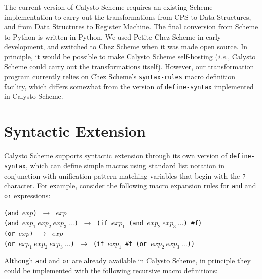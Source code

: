 \documentclass[acmsmall,screen,authorversion]{acmart}
\begin{document}
The current version of Calysto Scheme requires an existing Scheme
implementation to carry out the transformations from CPS to Data Structures,
and from Data Structures to Register Machine.  The final conversion from Scheme
to Python is written in Python.  We used Petite Chez Scheme in early
development, and switched to Chez Scheme when it was made open source. In
principle, it would be possible to make Calysto Scheme self-hosting
(\emph{i.e.}, Calysto Scheme could carry out the transformations
itself). However, our transformation program currently relies on Chez Scheme's
\texttt{syntax-rules} macro definition facility, which differs somewhat from
the version of \texttt{define-syntax} implemented in Calysto Scheme.


\section{Syntactic Extension}

\noindent
Calysto Scheme supports syntactic extension through its own version of
\texttt{define-syntax}, which can define simple macros using standard list
notation in conjunction with unification pattern matching variables that
begin with the \texttt{?} character.  For example, consider the following
macro expansion rules for \texttt{and} and \texttt{or} expressions:\\

\begin{minipage}{\textwidth}
\texttt{(and $\mathit{exp}$)} $~\rightarrow~$ $\mathit{exp}$\\
\texttt{(and $\mathit{exp}_1~\mathit{exp}_2~\mathit{exp}_3~\ldots$)} $~\rightarrow~$
\texttt{(if $\mathit{exp}_1$ (and $\mathit{exp}_2~\mathit{exp}_3~\ldots$) \#f)}\\

\texttt{(or $\mathit{exp}$)} $~\rightarrow~$ $\mathit{exp}$\\
\texttt{(or $\mathit{exp}_1~\mathit{exp}_2~\mathit{exp}_3~\ldots$)} $~\rightarrow~$
\texttt{(if $\mathit{exp}_1$ \#t (or $\mathit{exp}_2~\mathit{exp}_3~\ldots$))}\\
\end{minipage}

\noindent
Although \texttt{and} and \texttt{or} are already available in Calysto Scheme,
in principle they could be implemented with the following recursive macro
definitions:
\end{document}
